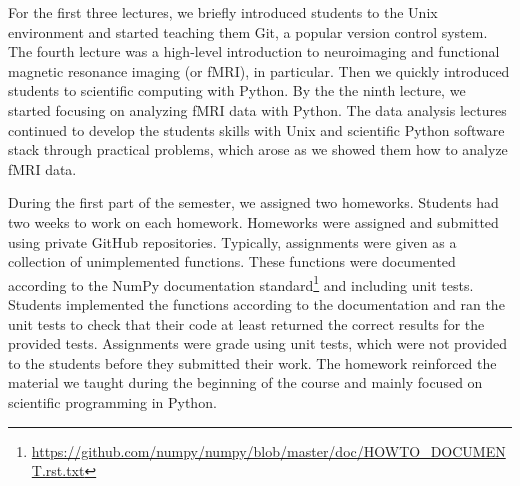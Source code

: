 For the first three lectures, we briefly introduced students to the Unix
environment and started teaching them Git, a popular version control system.
The fourth lecture was a high-level introduction to neuroimaging and
functional magnetic resonance imaging (or fMRI), in particular.
Then we quickly introduced students to scientific computing with Python.
By the the ninth lecture, we started focusing on analyzing fMRI data
with Python.
The data analysis lectures continued to develop the students skills with
Unix and scientific Python software stack through practical problems,
which arose as we showed them how to analyze fMRI data.




During the first part of the semester, we assigned two homeworks.
Students had two weeks to work on each homework.
Homeworks were assigned and submitted using private GitHub repositories.
Typically, assignments were given as a collection of unimplemented
functions.
These functions were documented according to the NumPy documentation
standard\footnote{\url{https://github.com/numpy/numpy/blob/master/doc/HOWTO_DOCUMENT.rst.txt}}
and including unit tests.
Students implemented the functions according to the documentation
and ran the unit tests to check that their code at least
returned the correct results for the provided tests.
Assignments were grade using unit tests, which were not provided to
the students before they submitted their work.
The homework reinforced the material we taught during the
beginning of the course and mainly focused on scientific programming
in Python.


